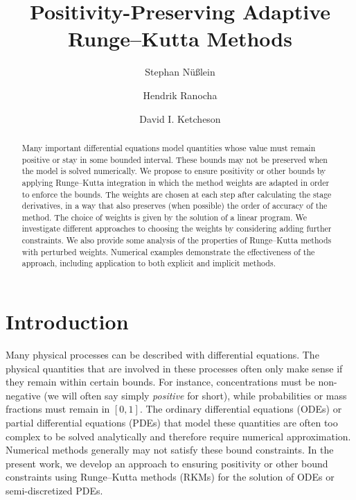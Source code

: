 \documentclass[a4paper]{article}
\title{Positivity-Preserving Adaptive Runge--Kutta Methods}
\author{Stephan Nüßlein \and Hendrik Ranocha \and David I. Ketcheson}
\numberwithin{equation}{section}
\theoremstyle{plain}
\theoremstyle{definition}
\numberwithin{theorem}{section}
\newcommand{\1}{\mathbbm{1}}
\begin{document}
\maketitle

\begin{abstract}
Many important differential equations model quantities whose value
must remain positive or stay in some bounded interval.
These bounds may not be preserved when the model is solved numerically.
We propose to ensure positivity or other bounds by applying Runge--Kutta
integration in which the method weights are adapted in order to
enforce the bounds.  The weights are chosen at each step after calculating the
stage derivatives, in a way that also preserves (when possible) the order of
accuracy of the method.  The choice of weights is given by the solution
of a linear program.
We investigate different approaches to choosing the weights by considering
adding further constraints.
We also provide some analysis of the properties
of Runge--Kutta methods with perturbed weights.  Numerical examples demonstrate
the effectiveness of the approach, including application to both explicit and
implicit methods.
\end{abstract}



\section{Introduction}


Many physical processes can be described with differential equations.
The physical quantities that are involved in these processes often only make sense if they remain within certain bounds.
For instance, concentrations must be non-negative (we will often say simply {\em positive} for short), while
probabilities or mass fractions must remain in $[0,1]$.
The ordinary differential equations (ODEs) or partial differential equations
(PDEs) that model these quantities are often too complex to be solved
analytically and therefore require numerical approximation.
Numerical methods generally may not satisfy these bound constraints.
In the present work, we develop an approach to ensuring positivity
or other bound constraints using Runge--Kutta methods (RKMs) for the
solution of ODEs or semi-discretized PDEs.
\end{document}
